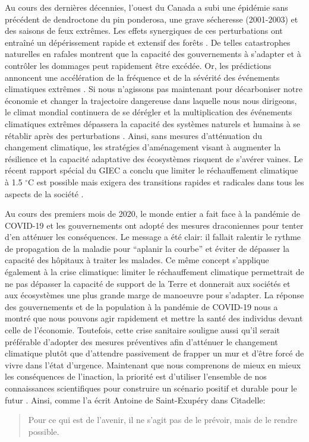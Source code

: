 Au cours des dernières décennies, l'ouest du Canada a subi une épidémie
sans précédent de dendroctone du pin ponderosa, une grave sécheresse
(2001-2003) et des saisons de feux extrêmes. Les effets synergiques de
ces perturbations ont entraîné un dépérissement rapide et extensif des
forêts \citep{williamson_climate_2009}. De telles catastrophes
naturelles en rafales montrent que la capacité des gouvernements à
s'adapter et à contrôler les dommages peut rapidement être excédée. Or,
les prédictions annoncent une accélération de la fréquence et de la
sévérité des événements climatiques extrêmes \citep{ipcc_climate_2014}.
Si nous n'agissons pas maintenant pour décarboniser notre économie et
changer la trajectoire dangereuse dans laquelle nous nous dirigeons, le
climat mondial continuera de se dérégler et la multiplication des
événements climatiques extrêmes dépassera la capacité des systèmes
naturels et humains à se rétablir après des perturbations
\citep{ipcc_summary_2018}. Ainsi, sans mesures d'atténuation du
changement climatique, les stratégies d'aménagement visant à augmenter
la résilience et la capacité adaptative des écosystèmes risquent de
s'avérer vaines. Le récent rapport spécial du GIEC a conclu que limiter
le réchauffement climatique à 1.5 \(^{\circ}\)C est possible mais
exigera des transitions rapides et radicales dans tous les aspects de la
société \citep{ipcc_summary_2018}.

Au cours des premiers mois de 2020, le monde entier a fait face à la
pandémie de COVID-19 et les gouvernements ont adopté des mesures
draconiennes pour tenter d'en atténuer les conséquences. Le message a
été clair: il fallait ralentir le rythme de propagation de la maladie
pour ``aplanir la courbe'' et éviter de dépasser la capacité des
hôpitaux à traiter les malades. Ce même concept s'applique également à
la crise climatique: limiter le réchauffement climatique permettrait de
ne pas dépasser la capacité de support de la Terre et donnerait aux
sociétés et aux écosystèmes une plus grande marge de manoeuvre pour
s'adapter. La réponse des gouvernements et de la population à la
pandémie de COVID-19 nous a montré que nous pouvons agir rapidement et
mettre la santé des individus devant celle de l'économie. Toutefois,
cette crise sanitaire souligne aussi qu'il serait préférable d'adopter
des mesures préventives afin d'atténuer le changement climatique plutôt
que d'attendre passivement de frapper un mur et d'être forcé de vivre
dans l'état d'urgence. Maintenant que nous comprenons de mieux en mieux
les conséquences de l'inaction, la priorité est d'utiliser l'ensemble de
nos connaissances scientifiques pour construire un scénario positif et
durable pour le futur \citep{bennett_bright_2016}. Ainsi, comme l'a
écrit Antoine de Saint-Exupéry dans Citadelle:

\begin{quote}
Pour ce qui est de l'avenir, il ne s'agit pas de le prévoir, mais de le
rendre possible.
\end{quote}
